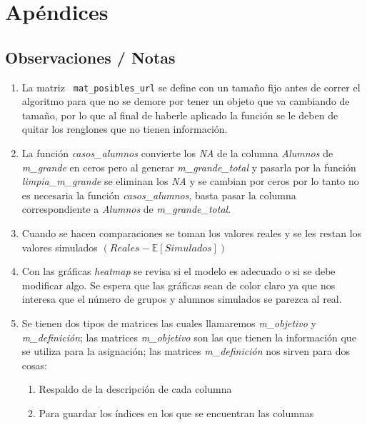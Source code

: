 \chapter{Apéndices} %

\section{Observaciones / Notas} %

\begin{enumerate}
	\item La matriz \verb+ mat_posibles_url+ se define con un tamaño fijo antes de correr el algoritmo para que no se demore por tener un objeto que va cambiando de tamaño, por lo que al final de haberle aplicado la función se le deben de quitar los renglones que no tienen información.

  \item La función \textit{casos\_alumnos} convierte los \textit{NA} de la columna \textit{Alumnos} de \textit{m\_grande} en ceros pero al generar \textit{m\_grande\_total} y pasarla por la función \textit{limpia\_m\_grande} se eliminan los \textit{NA} y se cambian por ceros por lo tanto no es necesaria la función \textit{casos\_alumnos}, basta pasar la columna correspondiente a \textit{Alumnos} de \textit{m\_grande\_total}.
  
  \item Cuando se hacen comparaciones se toman los valores reales y se les restan los valores simulados $(Reales - \mathbb{E}[Simulados])$

  \item Con las gráficas \textit{heatmap} se revisa si el modelo es adecuado o si se debe modificar algo. Se espera que las gráficas sean de color claro ya que nos interesa que el número de grupos y alumnos simulados se parezca al real.
  
  \item Se tienen dos tipos de matrices las cuales llamaremos \textit{m\_objetivo} y \textit{m\_definición}; las matrices \textit{m\_objetivo} son las que tienen la información que se utiliza para la asignación; las matrices \textit{m\_definición} nos sirven para dos cosas:
  
	\begin{enumerate}
		\item Respaldo de la descripción de cada columna
		
		\item Para guardar los índices en los que se encuentran las columnas
	\end{enumerate}
  

\end{enumerate}

